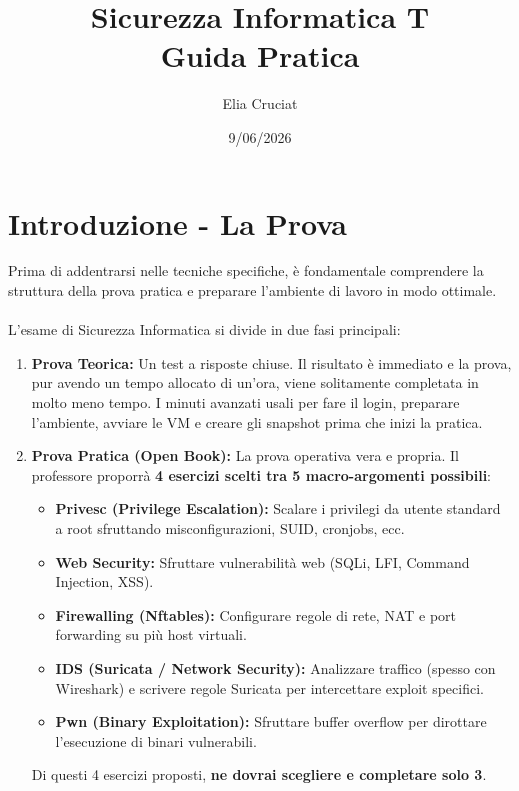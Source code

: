 \documentclass[12pt,a4paper]{report}
\title{\textbf{Sicurezza Informatica T\\Guida Pratica}}
\author{Elia Cruciat}
\date{9/06/2026}
\begin{document}
	\maketitle
	\tableofcontents
	\newpage
	
	\chapter*{Introduzione - La Prova}
	
	Prima di addentrarsi nelle tecniche specifiche, è fondamentale comprendere la struttura della prova pratica e preparare l'ambiente di lavoro in modo ottimale.\\\\
	L'esame di Sicurezza Informatica si divide in due fasi principali:
	\begin{enumerate}
		\item \textbf{Prova Teorica:} Un test a risposte chiuse. Il risultato è immediato e la prova, pur avendo un tempo allocato di un'ora, viene solitamente completata in molto meno tempo. I minuti avanzati usali per fare il login, preparare l'ambiente, avviare le VM e creare gli snapshot prima che inizi la pratica.
		\item \textbf{Prova Pratica (Open Book):} La prova operativa vera e propria. Il professore proporrà \textbf{4 esercizi scelti tra 5 macro-argomenti possibili}:
		\begin{itemize}
			\item \textbf{Privesc (Privilege Escalation):} Scalare i privilegi da utente standard a root sfruttando misconfigurazioni, SUID, cronjobs, ecc.
			\item \textbf{Web Security:} Sfruttare vulnerabilità web (SQLi, LFI, Command Injection, XSS).
			\item \textbf{Firewalling (Nftables):} Configurare regole di rete, NAT e port forwarding su più host virtuali.
			\item \textbf{IDS (Suricata / Network Security):} Analizzare traffico (spesso con Wireshark) e scrivere regole Suricata per intercettare exploit specifici.
			\item \textbf{Pwn (Binary Exploitation):} Sfruttare buffer overflow per dirottare l'esecuzione di binari vulnerabili.
		\end{itemize}
		Di questi 4 esercizi proposti, \textbf{ne dovrai scegliere e completare solo 3}.
	\end{enumerate}
	
\end{document}

